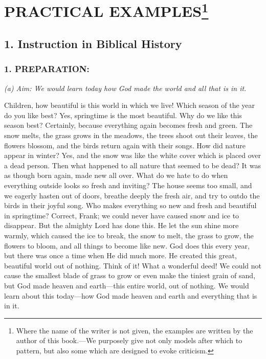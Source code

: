 \chapter[PRACTICAL EXAMPLES]{PRACTICAL EXAMPLES\footnote{Where the name of the writer is not given, the examples are written by the author of this book.—We purposely give not only models after which to pattern, but also some which are designed to evoke criticism.}}

\section{1. Instruction in Biblical History}

\subsection{1. PREPARATION:} \emph{(a) Aim: We would learn today how God made the world and all that is in it.}

Children, how beautiful is this world in which we live! Which season of the year do you like best? Yes, springtime is the most beautiful. Why do we like this season best? Certainly, because everything again becomes fresh and green. The snow melts, the grass grows in the meadows, the trees shoot out their leaves, the flowers blossom, and the birds return again with their songs. How did nature appear in winter? Yes, and the snow was like the white cover which is placed over a dead person. Then what happened to all nature that seemed to be dead? It was as though born again, made new all over. What do we hate to do when everything outside looks so fresh and inviting? The house seems too small, and we eagerly hasten out of doors, breathe deeply the fresh air, and try to outdo the birds in their joyful song. Who makes everything so new and fresh and beautiful in springtime? Correct, Frank; we could never have caused snow and ice to disappear. But the almighty Lord has done this. He let the sun shine more warmly, which caused the ice to break, the snow to melt, the grass to grow, the flowers to bloom, and all things to become like new. God does this every year, but there was once a time when He did much more. He created this great, beautiful world out of nothing. Think of it! What a wonderful deed! We could not cause the smallest blade of grass to grow or even make the tiniest grain of sand, but God made heaven and earth—this entire world, out of nothing. We would learn about this today—how God made heaven and earth and everything that is in it.

